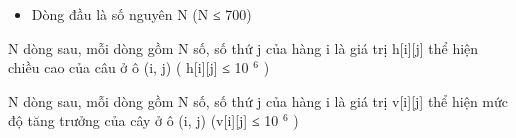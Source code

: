 \begin{itemize}
	\item     Dòng đầu là số nguyên N (N ≤ 700)   
\end{itemize}

   N dòng sau, mỗi dòng gồm N số, số thứ j của hàng i là giá trị h[i][j] thể hiện chiều cao của câu ở ô (i, j) ( h[i][j] ≤ 10   $^    6   $   )  

   N dòng sau, mỗi dòng gồm N số, số thứ j của hàng i là giá trị v[i][j] thể hiện mức độ tăng trưởng của cây ở ô (i, j) (v[i][j] ≤ 10   $^    6   $   )